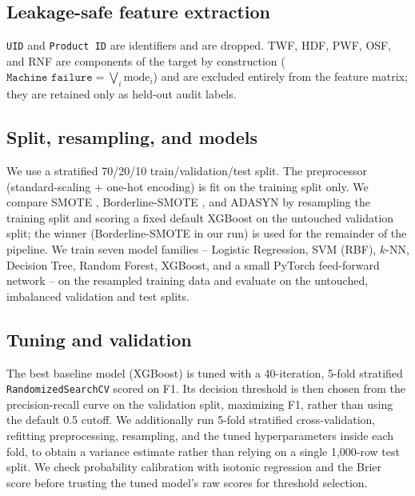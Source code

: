 \documentclass[11pt]{article}
\begin{document}
\subsection{Leakage-safe feature extraction}
\texttt{UID} and \texttt{Product ID} are identifiers and are dropped. TWF, HDF, PWF, OSF, and RNF
are components of the target by construction ($\texttt{Machine failure} = \bigvee_i \text{mode}_i$)
and are excluded entirely from the feature matrix; they are retained only as held-out audit labels.

\subsection{Split, resampling, and models}
We use a stratified 70/20/10 train/validation/test split. The preprocessor (standard-scaling $+$
one-hot encoding) is fit on the training split only. We compare SMOTE \citep{chawla2002smote},
Borderline-SMOTE \citep{han2005borderline}, and ADASYN \citep{he2008adasyn} by resampling the
training split and scoring a fixed default XGBoost \citep{chen2016xgboost} on the untouched
validation split; the winner (Borderline-SMOTE in our run) is used for the remainder of the
pipeline. We train seven model families -- Logistic Regression, SVM (RBF), $k$-NN, Decision Tree,
Random Forest, XGBoost, and a small PyTorch feed-forward network -- on the resampled training data
and evaluate on the untouched, imbalanced validation and test splits.

\subsection{Tuning and validation}
The best baseline model (XGBoost) is tuned with a 40-iteration, 5-fold stratified
\texttt{RandomizedSearchCV} scored on F1. Its decision threshold is then chosen from the
precision-recall curve on the validation split, maximizing F1, rather than using the default 0.5
cutoff. We additionally run 5-fold stratified cross-validation, refitting preprocessing, resampling,
and the tuned hyperparameters inside each fold, to obtain a variance estimate rather than relying on
a single 1{,}000-row test split. We check probability calibration with isotonic regression and the
Brier score before trusting the tuned model's raw scores for threshold selection.
\end{document}
